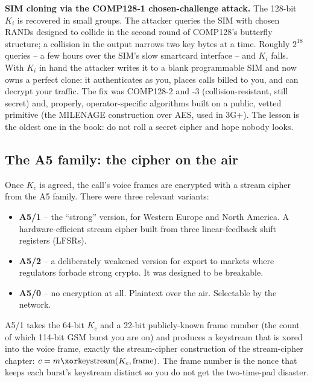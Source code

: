 \begin{attackbox}
\textbf{SIM cloning via the COMP128-1 chosen-challenge attack.} The 128-bit $K_i$ is recovered in small groups. The attacker queries the SIM with chosen RANDs designed to collide in the second round of COMP128's butterfly structure; a collision in the output narrows two key bytes at a time. Roughly $2^{18}$ queries -- a few hours over the SIM's slow smartcard interface -- and $K_i$ falls. With $K_i$ in hand the attacker writes it to a blank programmable SIM and now owns a perfect clone: it authenticates as you, places calls billed to you, and can decrypt your traffic. The fix was COMP128-2 and -3 (collision-resistant, still secret) and, properly, operator-specific algorithms built on a public, vetted primitive (the MILENAGE construction over AES, used in 3G+). The lesson is the oldest one in the book: do not roll a secret cipher and hope nobody looks.
\end{attackbox}

\subsection{The A5 family: the cipher on the air}
\label{ch29:a5}

Once $K_c$ is agreed, the call's voice frames are encrypted with a stream cipher from the A5 family. There were three relevant variants:

\begin{itemize}
  \item \textbf{A5/1} -- the ``strong'' version, for Western Europe and North America. A hardware-efficient stream cipher built from three linear-feedback shift registers (LFSRs).
  \item \textbf{A5/2} -- a deliberately weakened version for export to markets where regulators forbade strong crypto. It was designed to be breakable.
  \item \textbf{A5/0} -- no encryption at all. Plaintext over the air. Selectable by the network.
\end{itemize}

A5/1 takes the 64-bit $K_c$ and a 22-bit publicly-known frame number (the count of which 114-bit GSM burst you are on) and produces a keystream that is xored into the voice frame, exactly the stream-cipher construction of the stream-cipher chapter: $c = m \xor \text{keystream}(K_c, \text{frame})$. The frame number is the nonce that keeps each burst's keystream distinct so you do not get the two-time-pad disaster.

